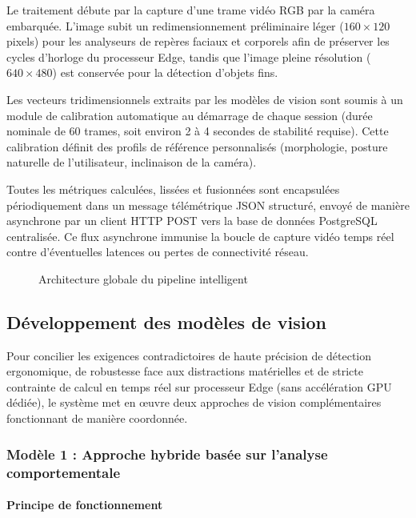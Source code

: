 Le traitement débute par la capture d'une trame vidéo RGB par la caméra embarquée. L'image subit un redimensionnement préliminaire léger ($160 \times 120$ pixels) pour les analyseurs de repères faciaux et corporels afin de préserver les cycles d'horloge du processeur Edge, tandis que l'image pleine résolution ($640 \times 480$) est conservée pour la détection d'objets fins.

Les vecteurs tridimensionnels extraits par les modèles de vision sont soumis à un module de calibration automatique au démarrage de chaque session (durée nominale de 60 trames, soit environ 2 à 4 secondes de stabilité requise). Cette calibration définit des profils de référence personnalisés (morphologie, posture naturelle de l'utilisateur, inclinaison de la caméra). 

Toutes les métriques calculées, lissées et fusionnées sont encapsulées périodiquement dans un message télémétrique JSON structuré, envoyé de manière asynchrone par un client HTTP POST vers la base de données PostgreSQL centralisée. Ce flux asynchrone immunise la boucle de capture vidéo temps réel contre d'éventuelles latences ou pertes de connectivité réseau.

\begin{figure}[H]
    \centering
    \caption{Architecture globale du pipeline intelligent}
    \label{fig:global_pipeline}
\end{figure}

\subsection{Développement des modèles de vision}

Pour concilier les exigences contradictoires de haute précision de détection ergonomique, de robustesse face aux distractions matérielles et de stricte contrainte de calcul en temps réel sur processeur Edge (sans accélération GPU dédiée), le système met en œuvre deux approches de vision complémentaires fonctionnant de manière coordonnée.

\subsubsection{Modèle 1 : Approche hybride basée sur l’analyse comportementale}

\paragraph{Principe de fonctionnement}

